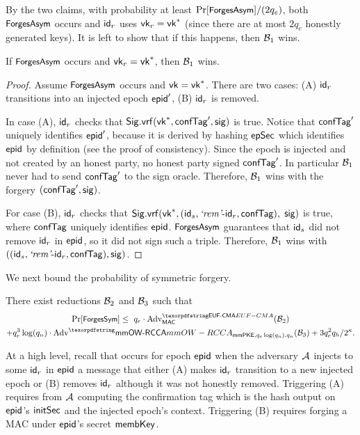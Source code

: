 By the two claims, with probability at least $\Pr[\forgesa]/(2q_e)$, both $\forgesa$ occurs and $\id_r$ uses $\ersvk_r=\ersvk^*$ (since there are at most $2q_e$ honestly generated keys). It is left to show that if this happens, then $\Bdv[1]$ wins.
\begin{claim}
  If $\forgesa$ occurs and $\ersvk_r=\ersvk^*$, then $\Bdv[1]$ wins.
\end{claim}
\begin{proof}
  Assume $\forgesa$ occurs and $\ersvk=\ersvk^*$. There are two cases: (A) $\id_r$ transitions into an injected epoch $\hgnodeid'$, (B) $\id_r$ is removed.

  In case (A), $\id_r$ checks that $\sigvrf(\ersvk^*, \confTag', \sig)$ is true. Notice that $\confTag'$ uniquely identifies $\hgnodeid'$, because it is derived by hashing $\epochSecret$ which identifies $\hgnodeid$ by definition (see the proof of \saik consistency). Since the epoch is injected and not created by an honest party, no honest party signed $\confTag'$. In particular $\Bdv[1]$ never had to send $\confTag'$ to the sign oracle. Therefore, $\Bdv[1]$ wins with the forgery $(\confTag', \sig)$.

  For case (B), $\id_r$ checks that $\sigvrf(\ersvk^*, (\id_s, \hglr\md\id_r, \confTag),$ $ \sig)$ is true, where $\confTag$ uniquely identifies $\hgnodeid$. $\forgesa$ guarantees that $\id_s$ did not remove $\id_r$ in $\hgnodeid$, so it did not sign such a triple. Therefore, $\Bdv[1]$ wins with $((\id_s, \hglr\md\id_r, \confTag), \sig)$.
\end{proof}

\newcommand{\hybridThreeN}{3$^*$\xspace}
\newcommand{\forgessN}{\forgess\xmath{^*}\xspace}
We next bound the probability of symmetric forgery.
\begin{lemma}
There exist reductions $\Bdv[2]$ and $\Bdv[3]$ such that
\begin{multline*}
    \Pr[\forgess] \leq \  q_e\cdot \textnormal{Adv}^{\ufcma}_\mac(\Bdv[2]) \\+ q_e^3\log(q_n)\cdot \textnormal{Adv}^\mmowrcca_{\mmPKE,q_e\log(q_n),q_n}(\Bdv[3])+  3q_e^2q_h/2^\kappa .
\end{multline*}
\end{lemma}

At a high level, recall that \forgess occurs for epoch $\hgnodeid$ when the adversary $\Adv$ injects to some $\id_r$ in $\hgnodeid$ a message that either (A) makes $\id_r$ transition to a new injected epoch or (B) removes $\id_r$ although it was not honestly removed. Triggering (A) requires from $\Adv$ computing the confirmation tag which is the hash output on $\hgnodeid$'s $\initSecret$ and the injected epoch's context. Triggering (B) requires forging a MAC under $\hgnodeid$'s secret $\membershipKey$.

